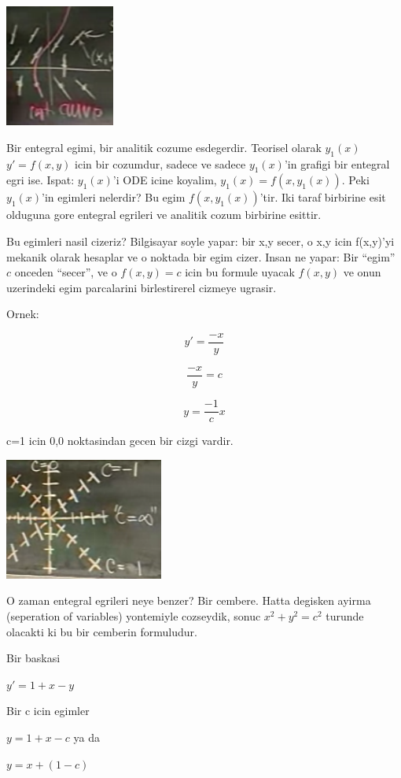 \documentclass[12pt,fleqn]{article}\usepackage{../common}
\begin{document}
\includegraphics[height=4cm]{./1_2.png}

Bir entegral egimi, bir analitik cozume esdegerdir. Teorisel olarak $y_1(x)$
$y'=f(x,y)$ icin bir cozumdur, sadece ve sadece $y_1(x)$'in grafigi bir entegral
egri ise. Ispat: $y_1(x)$'i ODE icine koyalim, $y_1(x) = f(x,y_1(x))$. Peki
$y_1(x)$'in egimleri nelerdir? Bu egim $f(x,y_1(x))$'tir. Iki taraf birbirine
esit olduguna gore entegral egrileri ve analitik cozum birbirine esittir.

Bu egimleri nasil cizeriz? Bilgisayar soyle yapar: bir x,y secer, o x,y icin
f(x,y)'yi mekanik olarak hesaplar ve o noktada bir egim cizer. Insan ne yapar:
Bir ``egim'' $c$ onceden ``secer'', ve o $f(x,y)=c$ icin bu formule uyacak
$f(x,y)$ ve onun uzerindeki egim parcalarini birlestirerel cizmeye ugrasir.

Ornek: 

\[ y' = \frac{-x}{y} \]

\[ \frac{-x}{y} = c \]

\[ y = \frac{-1}{c}x \]

c=1 icin 0,0 noktasindan gecen bir cizgi vardir.

\includegraphics[height=4cm]{./1_3.png}

O zaman entegral egrileri neye benzer? Bir cembere. Hatta degisken ayirma
(seperation of variables) yontemiyle cozseydik, sonuc $x^2+y^2=c^2$ turunde
olacakti ki bu bir cemberin formuludur.

Bir baskasi

$y' = 1+x-y$

Bir c icin egimler

$y = 1+x-c$ ya da

$y = x+(1-c)$
\end{document}
